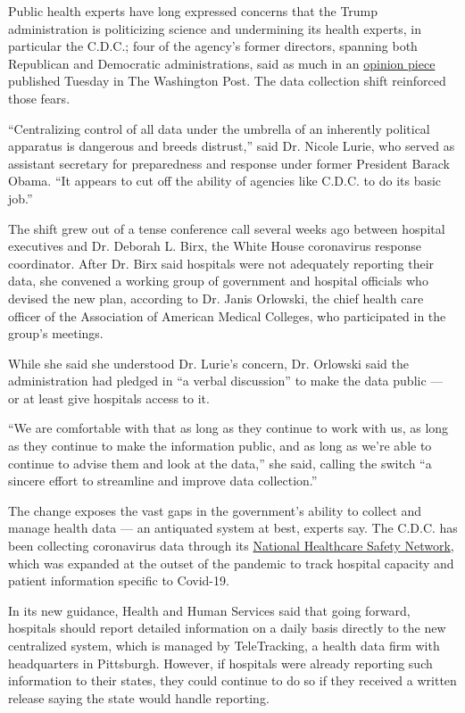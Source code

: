 Public health experts have long expressed concerns that the Trump
administration is politicizing science and undermining its health
experts, in particular the C.D.C.; four of the agency's former
directors, spanning both Republican and Democratic administrations, said
as much in an
\href{https://www.washingtonpost.com/outlook/2020/07/14/cdc-directors-trump-politics/}{opinion
piece} published Tuesday in The Washington Post. The data collection
shift reinforced those fears.

``Centralizing control of all data under the umbrella of an inherently
political apparatus is dangerous and breeds distrust,'' said Dr. Nicole
Lurie, who served as assistant secretary for preparedness and response
under former President Barack Obama. ``It appears to cut off the ability
of agencies like C.D.C. to do its basic job.''

The shift grew out of a tense conference call several weeks ago between
hospital executives and Dr. Deborah L. Birx, the White House coronavirus
response coordinator. After Dr. Birx said hospitals were not adequately
reporting their data, she convened a working group of government and
hospital officials who devised the new plan, according to Dr. Janis
Orlowski, the chief health care officer of the Association of American
Medical Colleges, who participated in the group's meetings.

While she said she understood Dr. Lurie's concern, Dr. Orlowski said the
administration had pledged in ``a verbal discussion'' to make the data
public --- or at least give hospitals access to it.

``We are comfortable with that as long as they continue to work with us,
as long as they continue to make the information public, and as long as
we're able to continue to advise them and look at the data,'' she said,
calling the switch ``a sincere effort to streamline and improve data
collection.''

The change exposes the vast gaps in the government's ability to collect
and manage health data --- an antiquated system at best, experts say.
The C.D.C. has been collecting coronavirus data through its
\href{https://www.cdc.gov/nhsn/index.html}{National Healthcare Safety
Network}, which was expanded at the outset of the pandemic to track
hospital capacity and patient information specific to Covid-19.

In its new guidance, Health and Human Services said that going forward,
hospitals should report detailed information on a daily basis directly
to the new centralized system, which is managed by TeleTracking, a
health data firm with headquarters in Pittsburgh. However, if hospitals
were already reporting such information to their states, they could
continue to do so if they received a written release saying the state
would handle reporting.

